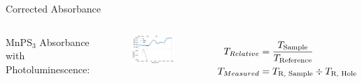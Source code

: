\documentclass[
	10pt,
]{beamer}
\begin{document}
\begin{frame}{Corrected Absorbance}
	\begin{columns}
		MnPS$_3$ Absorbance with Photoluminescence:
		\begin{figure}
			\includegraphics[width=\textwidth]{../figures/2024-03-15 MnPS3 Absorbance with PL.pdf}
		\end{figure}

		\begin{align*}
			T_{Relative} &= \frac{T_\text{Sample}}{T_\text{Reference}}\\
			T_{Measured} &= T_\text{R, Sample} \divisionsymbol T_\text{R, Hole}
		\end{align*}
	\end{columns}
\end{frame}
\end{document}
